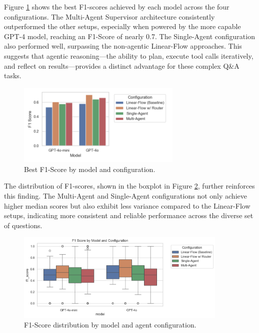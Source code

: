         Figure \ref{fig:best_f1_by_model_and_configuration} shows the best F1-scores achieved by each model across the four configurations. The Multi-Agent Supervisor architecture consistently outperformed the other setups, especially when powered by the more capable GPT-4 model, reaching an F1-Score of nearly 0.7. The Single-Agent configuration also performed well, surpassing the non-agentic Linear-Flow approaches. This suggests that agentic reasoning—the ability to plan, execute tool calls iteratively, and reflect on results—provides a distinct advantage for these complex Q\&A tasks.

        \begin{figure}[h]
            \centering
            \includegraphics[width=0.7\textwidth]{images_exp2/bar_best_f1_by_model_and_configuration.png}
            \caption{Best F1-Score by model and configuration.}
            \label{fig:best_f1_by_model_and_configuration}
        \end{figure}

        The distribution of F1-scores, shown in the boxplot in Figure \ref{fig:f1_score_by_model_and_configuration}, further reinforces this finding. The Multi-Agent and Single-Agent configurations not only achieve higher median scores but also exhibit less variance compared to the Linear-Flow setups, indicating more consistent and reliable performance across the diverse set of questions.

        \begin{figure}[h]
            \centering
            \includegraphics[width=0.9\textwidth]{images_exp2/f1_score_by_model_and_configuration.png}
            \caption{F1-Score distribution by model and agent configuration.}
            \label{fig:f1_score_by_model_and_configuration}
        \end{figure}

